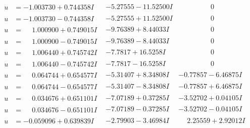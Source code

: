\documentclass[1p]{elsarticle_modified}
\theoremstyle{definition}
\begin{document}
$$\begin{array}{c|c|c}
\begin{aligned}
u &= -1.003730 + 0.744358 I\end{aligned}
 & -5.27555 - 11.52500 I & \phantom{-0.000000 } 0 \\ \hline\begin{aligned}
u &= -1.003730 - 0.744358 I\end{aligned}
 & -5.27555 + 11.52500 I & \phantom{-0.000000 } 0 \\ \hline\begin{aligned}
u &= \phantom{-}1.000900 + 0.749015 I\end{aligned}
 & -9.76389 + 8.44033 I & \phantom{-0.000000 } 0 \\ \hline\begin{aligned}
u &= \phantom{-}1.000900 - 0.749015 I\end{aligned}
 & -9.76389 - 8.44033 I & \phantom{-0.000000 } 0 \\ \hline\begin{aligned}
u &= \phantom{-}1.006440 + 0.745742 I\end{aligned}
 & -7.7817 + 16.5258 I & \phantom{-0.000000 } 0 \\ \hline\begin{aligned}
u &= \phantom{-}1.006440 - 0.745742 I\end{aligned}
 & -7.7817 - 16.5258 I & \phantom{-0.000000 } 0 \\ \hline\begin{aligned}
u &= \phantom{-}0.064744 + 0.654577 I\end{aligned}
 & -5.31407 + 8.34808 I & -0.77857 - 6.46875 I \\ \hline\begin{aligned}
u &= \phantom{-}0.064744 - 0.654577 I\end{aligned}
 & -5.31407 - 8.34808 I & -0.77857 + 6.46875 I \\ \hline\begin{aligned}
u &= \phantom{-}0.034676 + 0.651101 I\end{aligned}
 & -7.07189 + 0.37285 I & -3.52702 + 0.04105 I \\ \hline\begin{aligned}
u &= \phantom{-}0.034676 - 0.651101 I\end{aligned}
 & -7.07189 - 0.37285 I & -3.52702 - 0.04105 I \\ \hline\begin{aligned}
u &= -0.059096 + 0.639839 I\end{aligned}
 & -2.79903 - 3.46984 I & \phantom{-}2.25559 + 2.92012 I \\ \hline\begin{aligned}

\end{aligned}
\end{array}$$
\end{document}
